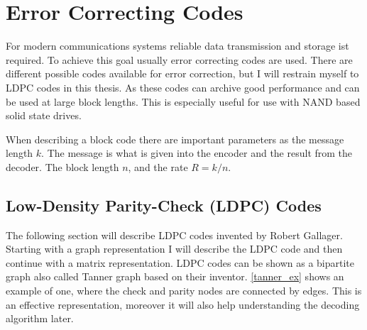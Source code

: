 
\chapter{Error Correcting Codes}

For modern communications systems reliable data transmission and storage ist required. To achieve this goal usually error correcting codes are used. There are different possible codes available for error correction, but I will restrain myself to LDPC\cite{Ga63} codes in this thesis. As these codes can archive good performance and can be used at large block lengths\cite{TaSc2017}. This is especially useful for use with NAND based solid state drives.

When describing a block code there are important parameters as the message length $k$. The message is what is given into the encoder and the result from the decoder. The block length $n$, and the rate $R = k / n$. 


\section{Low-Density Parity-Check (LDPC) Codes}

The following section will describe LDPC codes invented by Robert Gallager\cite{Ga63}. Starting with a graph representation I will describe the LDPC code and then continue with a matrix representation. LDPC codes can be shown as a bipartite graph also called Tanner graph\cite{Ta81} based on their inventor. \cref{tanner_ex} shows an example of one, where the check and parity nodes are connected by edges. This is an effective representation, moreover it will also help understanding the decoding algorithm later.

